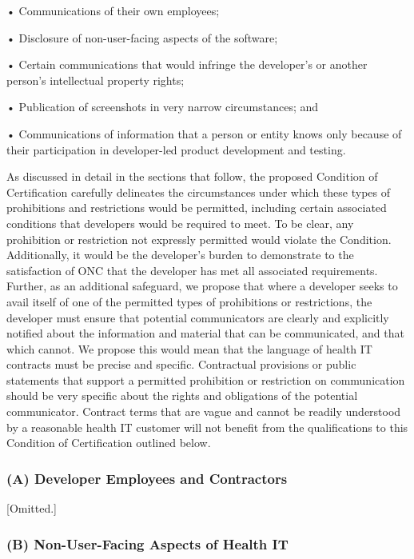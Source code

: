 \documentclass[twoside,11pt]{article}
\begin{document}
          • Communications of their own employees;


          • Disclosure of non-user-facing aspects of the software;


          • Certain communications that would infringe the developer's or another person's intellectual property rights;


          • Publication of screenshots in very narrow circumstances; and


          • Communications of information that a person or entity knows only because of their participation in developer-led product development and testing.


          As discussed in detail in the sections that follow, the proposed Condition of Certification carefully delineates the circumstances under which these types of prohibitions and restrictions would be permitted, including certain associated conditions that developers would be required to meet. To be clear, any prohibition or restriction not expressly permitted would violate the Condition. Additionally, it would be the developer's burden to demonstrate to the satisfaction of ONC that the developer has met all associated requirements. Further, as an additional safeguard, we propose that where a developer seeks to avail itself of one of the permitted types of prohibitions or restrictions, the developer must ensure that potential communicators are clearly and explicitly notified about the information and material that can be communicated, and that which cannot. We propose this would mean that the language of health IT contracts must be precise and specific. Contractual provisions or public statements that support a permitted prohibition or restriction on communication should be very specific about the rights and obligations of the potential communicator. Contract terms that are vague and cannot be readily understood by a reasonable health IT customer will not benefit from the qualifications to this Condition of Certification outlined below.


          \subsubsection{(A) Developer Employees and Contractors}


          [Omitted.]


          \subsubsection{(B) Non-User-Facing Aspects of Health IT}
\end{document}
